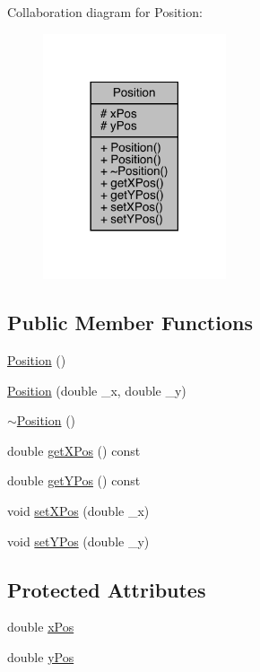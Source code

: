 Collaboration diagram for Position\+:
\nopagebreak
\begin{figure}[H]
\begin{center}
\leavevmode
\includegraphics[width=153pt]{class_position__coll__graph}
\end{center}
\end{figure}
\subsection*{Public Member Functions}
\begin{DoxyCompactItemize}
\item 
\mbox{\hyperlink{class_position_a369a577425f8ba02e8750d04b6a088db}{Position}} ()
\item 
\mbox{\hyperlink{class_position_a75efef3ff44bc0bd38f7f10abb3a53fe}{Position}} (double \+\_\+x, double \+\_\+y)
\item 
\mbox{\hyperlink{class_position_abe83df4cab7af756636b4e39e4378f4a}{$\sim$\+Position}} ()
\item 
double \mbox{\hyperlink{class_position_a961116b828f39200092daddffca2a63c}{get\+X\+Pos}} () const
\item 
double \mbox{\hyperlink{class_position_a9bf258e61c4d01643599c175007254ac}{get\+Y\+Pos}} () const
\item 
void \mbox{\hyperlink{class_position_a9452ac5b29a317165ea9ee8386b82581}{set\+X\+Pos}} (double \+\_\+x)
\item 
void \mbox{\hyperlink{class_position_ae30f190ecd76be1de484773d9544a7f6}{set\+Y\+Pos}} (double \+\_\+y)
\end{DoxyCompactItemize}
\subsection*{Protected Attributes}
\begin{DoxyCompactItemize}
\item 
double \mbox{\hyperlink{class_position_a14ec3b05a733470d871518491601669f}{x\+Pos}}
\item 
double \mbox{\hyperlink{class_position_ad6bf63afed8bcc92e4fb74b7d5d7eabc}{y\+Pos}}
\end{DoxyCompactItemize}


